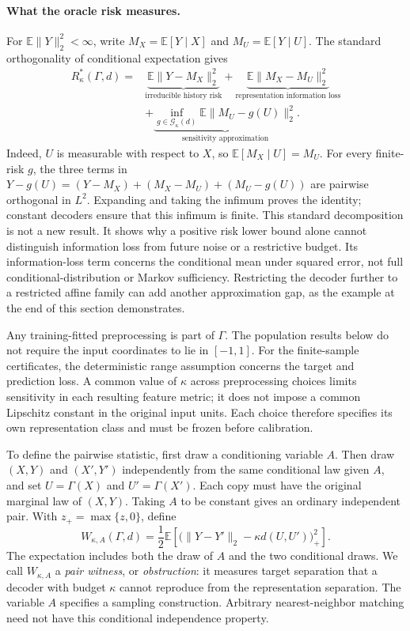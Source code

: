 \paragraph{What the oracle risk measures.}
For $\mathbb E\|Y\|_2^2<\infty$, write
$M_X=\mathbb E[Y\mid X]$ and $M_U=\mathbb E[Y\mid U]$.
The standard orthogonality of conditional expectation gives
\begin{equation}
\begin{split}
 R^*_\kappa(\Gamma,d)
 ={}&\underbrace{\mathbb E\|Y-M_X\|_2^2}_{\text{irreducible history risk}}
   +\underbrace{\mathbb E\|M_X-M_U\|_2^2}_{\text{representation information loss}}\\
 &+\underbrace{\inf_{g\in\mathcal G_\kappa(d)}
       \mathbb E\|M_U-g(U)\|_2^2}_{\text{sensitivity approximation}}.
\end{split}
\label{eq:risk-decomposition}
\end{equation}
Indeed, $U$ is measurable with respect to $X$, so
$\mathbb E[M_X\mid U]=M_U$. For every finite-risk $g$, the three
terms in $Y-g(U)=(Y-M_X)+(M_X-M_U)+(M_U-g(U))$ are pairwise
orthogonal in $L^2$. Expanding and taking the infimum proves the identity;
constant decoders ensure that this infimum is finite. This standard
decomposition is not a new result. It shows why a positive risk lower bound
alone cannot distinguish information loss from future noise or a restrictive
budget. Its information-loss term concerns the conditional mean under squared
error, not full conditional-distribution or Markov sufficiency. Restricting
the decoder further to a restricted affine family can add another approximation
gap, as the example at the end of this section demonstrates.

Any training-fitted preprocessing is part of $\Gamma$. The population
results below do not require the input coordinates to lie in $[-1,1]$.
For the finite-sample certificates, the deterministic range assumption
concerns the target and prediction loss. A common value of $\kappa$ across
preprocessing choices limits sensitivity in each resulting feature metric;
it does not impose a common Lipschitz constant in the original input units.
Each choice therefore specifies its own representation class and must be
frozen before calibration.

To define the pairwise statistic, first draw a conditioning variable $A$.
Then draw $(X,Y)$ and $(X',Y')$ independently from the same conditional law
given $A$, and set $U=\Gamma(X)$ and $U'=\Gamma(X')$. Each copy must have
the original marginal law of $(X,Y)$. Taking $A$ to be constant gives an
ordinary independent pair. With $z_+=\max\{z,0\}$, define
\begin{equation}
 W_{\kappa,A}(\Gamma,d)
 =\frac12\mathbb E\left[
       \bigl(\|Y-Y'\|_2-\kappa d(U,U')\bigr)_+^2\right].
 \label{eq:pair-witness}
\end{equation}
The expectation includes both the draw of $A$ and the two conditional draws.
We call $W_{\kappa,A}$ a \emph{pair witness}, or \emph{obstruction}: it
measures target separation that a decoder with budget $\kappa$ cannot
reproduce from the representation separation. The variable $A$ specifies
a sampling construction. Arbitrary nearest-neighbor matching need not have
this conditional independence property.

